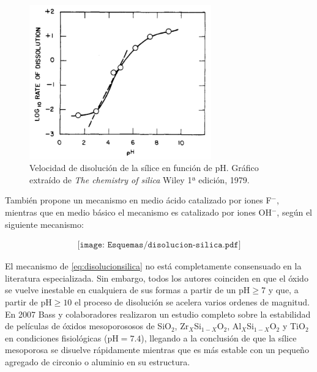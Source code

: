 			\begin{figure}[th!]
			    \begin{center}
			    \includegraphics[width=0.70\textwidth]{Graficos/disolucion_ph.jpg}
	       		\caption[Velocidad de disolución sílice en función del pH]{Velocidad de disolución de la sílice en función de pH. Gráfico extraído de \textit{The chemistry of silica} Wiley 1ª edición, 1979.\cite{iler1979}}
	         	\label{fig:disolucion_ph}
	     		\end{center}
	     		\end{figure}
	
	También propone un mecanismo en medio ácido catalizado por iones F$^-$, mientras que en medio básico el mecanismo es catalizado por iones OH$^-$, según el siguiente mecanismo:
		
			\begin{equation}
				\begin{aligned}
				\texttt{[image: Esquemas/disolucion-silica.pdf]}
				\label{eq:disolucionsilica}
				\end{aligned}
				\end{equation} 
	
	El mecanismo de \ref{eq:disolucionsilica} no está completamente consensuado en la literatura especializada. Sin embargo, todos los autores coinciden en que el óxido se vuelve inestable en cualquiera de sus formas a partir de un $\text{pH}\geq7$ y que, a partir de $\text{pH}\geq10$ el proceso de disolución se acelera varios ordenes de magnitud.\cite{Kosmulski2002,Kosmulski2014,Schwarz1984,Si-HanWu2013,iler1979} En 2007 Bass y colaboradores\cite{bass2007} realizaron un estudio completo sobre la estabilidad de películas de óxidos mesoporososos de SiO$_2$, Zr$_X$Si$_{1-X}$O$_2$, Al$_X$Si$_{1-X}$O$_2$ y TiO$_2$ en condiciones fisiológicas (pH$=7.4$), llegando a la conclusión de que la sílice mesoporosa se disuelve rápidamente mientras que es más estable con un pequeño agregado de circonio o aluminio en su estructura.

